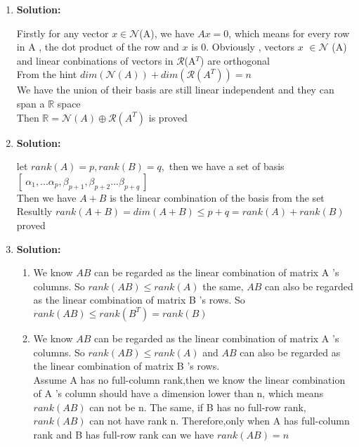 \documentclass[english,onecolumn,UTF8]{IEEEtran}
\begin{document}
\begin{enumerate}
	 
	\item \textbf{Solution:}
	
	 Firstly for any vector \(x \in \mathcal{N} \)(A), \quad we have  \(Ax=0\), which means for every row in A , the dot product of the row and $x$ is 0. Obviously	, vectors \(x\) \( \in \mathcal{N} \) (A) and linear conbinations of vectors in \(\mathcal{R}\)(A\(^{T}\)) are orthogonal \\
	From the hint $dim(\mathcal{N}(A))+ dim(\mathcal{R}(A^{T}))=n$ \\
	We have the union of their basis are still linear independent and they can span a $\mathbb{R}$ space \\
	Then $\mathbb{R} = \mathcal{N}(A) \oplus \mathcal{R}(A^{T})$ is proved
	

	\item \textbf{Solution:}

	let \(rank(A)=p,rank(B)=q\),\ then we have a set of basis \([\ \alpha_{1},...\alpha_{p},\beta_{p+1},\beta_{p+2}...\beta_{p+q}\ ]\) \\
	Then we have \(A+B\) is the linear combination of the basis from the set \\
	Resultly \(rank(A+B) = dim(A+B) \leq p+q =rank(A)+rank(B)\)\\
	proved
	




	
	\item \textbf{Solution:}
	\begin{enumerate}
	\item We know \(AB\) can be regarded as the linear combination of matrix A 's columns. So \(rank(AB) \leq rank(A)\) 
	the same, \(AB\) can also be regarded as the linear combination of matrix B 's rows. So \(rank(AB) \leq  rank(B^{T})=rank(B)\)\\
	
	\item We know \(AB\) can be regarded as the linear combination of matrix A 's columns. So \(rank(AB) \leq rank(A)\) 
	and \(AB\) can also be regarded as the linear combination of matrix B 's rows.\\
	Assume A has no full-column rank,then we know the linear combination of A 's column should have a dimension lower than n, which means $rank(AB)$ can not be n. The same, if B has no full-row rank, $rank(AB)$ can not have rank n.
	Therefore,only when A has full-column rank and B has full-row rank can we have \(rank(AB)=n\)
	

\end{enumerate}
\end{enumerate}
\end{document}
